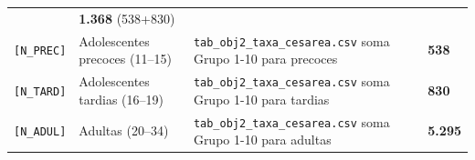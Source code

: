 \documentclass[
]{article}
\begin{document}
\begin{longtable}[]{@{}llll@{}}
\begin{minipage}[t]{0.22\columnwidth}
\end{minipage} & \begin{minipage}[t]{0.22\columnwidth}\raggedright
\textbf{1.368} (538+830)\strut
\end{minipage}\tabularnewline
\begin{minipage}[t]{0.22\columnwidth}\raggedright
\texttt{{[}N\_PREC{]}}\strut
\end{minipage} & \begin{minipage}[t]{0.22\columnwidth}\raggedright
Adolescentes precoces (11--15)\strut
\end{minipage} & \begin{minipage}[t]{0.22\columnwidth}\raggedright
\texttt{tab\_obj2\_taxa\_cesarea.csv} soma Grupo 1-10 para
precoces\strut
\end{minipage} & \begin{minipage}[t]{0.22\columnwidth}\raggedright
\textbf{538}\strut
\end{minipage}\tabularnewline
\begin{minipage}[t]{0.22\columnwidth}\raggedright
\texttt{{[}N\_TARD{]}}\strut
\end{minipage} & \begin{minipage}[t]{0.22\columnwidth}\raggedright
Adolescentes tardias (16--19)\strut
\end{minipage} & \begin{minipage}[t]{0.22\columnwidth}\raggedright
\texttt{tab\_obj2\_taxa\_cesarea.csv} soma Grupo 1-10 para tardias\strut
\end{minipage} & \begin{minipage}[t]{0.22\columnwidth}\raggedright
\textbf{830}\strut
\end{minipage}\tabularnewline
\begin{minipage}[t]{0.22\columnwidth}\raggedright
\texttt{{[}N\_ADUL{]}}\strut
\end{minipage} & \begin{minipage}[t]{0.22\columnwidth}\raggedright
Adultas (20--34)\strut
\end{minipage} & \begin{minipage}[t]{0.22\columnwidth}\raggedright
\texttt{tab\_obj2\_taxa\_cesarea.csv} soma Grupo 1-10 para adultas\strut
\end{minipage} & \begin{minipage}[t]{0.22\columnwidth}\raggedright
\textbf{5.295}\strut
\end{minipage}\tabularnewline
\bottomrule
\end{longtable}
\end{document}

